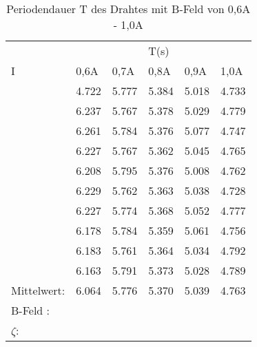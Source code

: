 \begin{table}
    \centering
    \label{tab:tabelle_1}
    \begin{tabular}{p{3cm} | p{1.5cm} p{1.5cm} p{1.5cm} p{1.5cm} p{1.5cm}}
      &      &      & T(s) &      &     \\
    I & 0,6A & 0,7A & 0,8A & 0,9A & 1,0A\\
    \midrule
    & 4.722 &  5.777 &  5.384 &  5.018 &  4.733\\
    & 6.237 &  5.767 &  5.378 &  5.029 &  4.779\\
    & 6.261 &  5.784 &  5.376 &  5.077 &  4.747\\
    & 6.227 &  5.767 &  5.362 &  5.045 &  4.765\\
    & 6.208 &  5.795 &  5.376 &  5.008 &  4.762\\
    & 6.229 &  5.762 &  5.363 &  5.038 &  4.728\\
    & 6.227 &  5.774 &  5.368 &  5.052 &  4.777\\
    & 6.178 &  5.784 &  5.359 &  5.061 &  4.756\\
    & 6.183 &  5.761 &  5.364 &  5.034 &  4.792\\
    & 6.163 &  5.791 &  5.373 &  5.028 &  4.789\\
    \midrule
    Mittelwert:    & 6.064 & 5.776 & 5.370 & 5.039 &  4.763 \\
    \midrule
    B-Feld : & & & & & \\
    $\zeta$: & & & & & \\
    \bottomrule
    \end{tabular}
    \caption{Periodendauer T des Drahtes mit B-Feld von 0,6A - 1,0A}
    \label{tab:tabelle_06A}
\end{table}





\label{sec:Auswertung}
